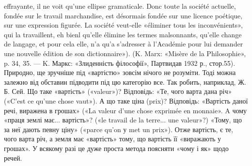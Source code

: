 effrayante, il ne voit qu’une ellipse gramaticale. Donc toute la société actuelle,
fondée sur le travail marchandise, est désormais fondée sur une licence
poétique, sur une expression figurée. La société veut-elle «éliminer tous
les inconvénients», qui la travaillent, eh bienl qu’elle élimine les termes
malsonnants, qu’elle change de langage, et pour cela elle, n’a qu’a s’adresser
à l’Académie pour lui demander une nouvelle édition de son dictionnaire»).
(K. Marx: «Misère de la Philosophie», p. 34, 35. — K. Маркс: «Злиденність
філософії», Партвидав 1932 р., стор.55). Природно, ще зручніше під «вартістю»
зовсім нічого не розуміти. Тоді можна залежно від обставин підводити
під цю категорію все. Так робить, наприклад, Ж. Б. Сей. Що
таке «вартість» («valeur»)? Відповідь: «Те, чого варта дана річ» («C’est
ce qu’une chose vaut»). А що таке ціна (prix)? Відповідь: «Вартість даної
речі, виражена в грошах» («La valeur d’une chose exprimée en monnaie».
A чому «праця землі має... вартість»? («le travail de la terre... une
valeur»?) «Тому, що за неї дають певну ціну» («parce qu’on у met un
prix»). Отже вартість, є те, чого варта річ, а земля має «вартість» тому,
що вартість її «виражають у грошах». У всякому разі це дуже проста
метода поясняти «чому і як» щодо речей.
\parbreak{}  %

